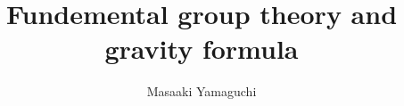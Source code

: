 \documentclass{jsarticle}
\begin{document}
\title{Fundemental group theory and gravity formula}
\author{Masaaki Yamaguchi}
\date{}
\maketitle
   \newcommand{\variint}{%
	\begin{picture}(15,30)
		\put(0,0){
			$ \iint $}
		\put(0,5){\line(15,0){15}}
	\end{picture} %
}

\newcommand{\variiint}{%
	\begin{picture}(15,15)
		\put(0,0){
			$ \iiint $}
		\put(0,5){\line(15,0){20}}
	\end{picture} %
}



 \newcommand{\alearletter}{%
	 \begin{picture}(10,20)
		 \put(0,0){
			 $ \square $}
		 \put(0,0){\line(1,1){10}}
	 \end{picture} %
	 }

 \newcommand{\secproduct}{%
	 \begin{picture}(10,20)
		 \put(0,0){
			 $ \nabla $}
		 \put(5,0){+}
	 \end{picture} %
	 }
 \newcommand{\talot}{%
	 \begin{picture}(15,20)
		 \put(0,0){
			 $ \text{\scalebox{2.0}[2]{$\nabla$}}$}
		 \put(5,3){
			 $ \Delta $}
	 \end{picture} %
	 }
 \newcommand{\hazerdnabla}{%
	 \begin{picture}(15,20)
		 \put(0,0){
			 $ \text{\scalebox{2.0}[2]{$\nabla$}}$}
		 \put(5,3){
			 $\text{Y}  $}
	 \end{picture} %
	 }

 \newcommand{\securebox}{%
	 \begin{picture}(15,20)
		 \put(0,0){
			 $ \text{\scalebox{2.0}[2]{$\square$}}$}
		 \put(5,3){
			 $\text{Y}  $}
	 \end{picture} %
	 }


\newcommand{\timebow}{%
	\begin{picture}(5,5)
		\put(0,0){$\text{\rotatebox{90}{$\bowtie$}}$}
	\end{picture} %
	}


 \newcommand{\flowerletter}{%
	 \begin{picture}(10,20)
		 \put(0,0){$\text{\scalebox{1.0}[1]{$\square$}}$}
		 \put(0,0){$\text{\scalebox{1.0}[2]{$\int$}}$}
	 \end{picture} %
	 }
\newcommand{\squareiint}{%
	\begin{picture}(15,30)
		\put(0,0){
			$ \iint $}
		\put(0,5){$\text{\scalebox{2.0}[1]{$\square$}}$}
	\end{picture} %
}
\end{document}
